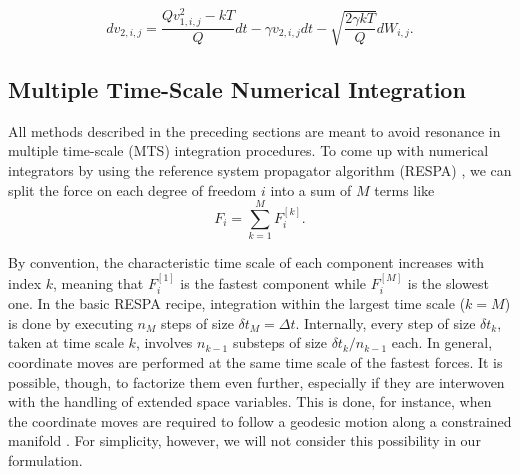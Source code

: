\documentclass[
aip,
jcp,
reprint,
]{revtex4-1}
\begin{document}
\begin{equation}
dv_{2,i,j} = \frac{Q v_{1,i,j}^2 - k T}{Q} dt - \gamma v_{2,i,j} dt - \sqrt{\frac{2 \gamma k T}{Q}} dW_{i,j}.
\end{equation}

\subsection{Multiple Time-Scale Numerical Integration}
\label{sec: numerical integration}

All methods described in the preceding sections are meant to avoid resonance in multiple time-scale (MTS) integration procedures.
To come up with numerical integrators by using the reference system propagator algorithm (RESPA) \cite{Tuckerman_1992}, we can split the force on each degree of freedom $i$ into a sum of $M$ terms like
\begin{equation*}
F_i = \sum_{k=1}^M F_i^{[k]}.
\end{equation*}

By convention, the characteristic time scale of each component increases with index $k$, meaning that $F_i^{[1]}$ is the fastest component while $F_i^{[M]}$ is the slowest one.
In the basic RESPA recipe, integration within the largest time scale ($k=M$) is done by executing $n_M$ steps of size $\delta t_M = \Delta t$.
Internally, every step of size $\delta t_k$, taken at time scale $k$, involves $n_{k-1}$ substeps of size $\delta t_k/n_{k-1}$ each.
In general, coordinate moves are performed at the same time scale of the fastest forces.
It is possible, though, to factorize them even further, especially if they are interwoven with the handling of extended space variables.
This is done, for instance, when the coordinate moves are required to follow a geodesic motion along a constrained manifold \cite{Leimkuhler_2016b}.
For simplicity, however, we will not consider this possibility in our formulation.
\end{document}

